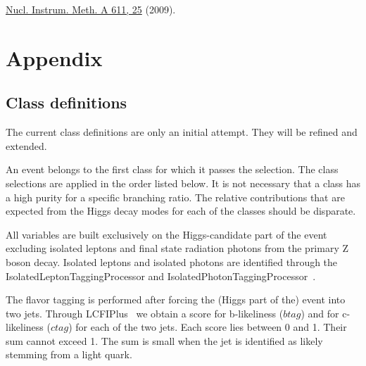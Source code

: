 \documentclass[11pt, hidelinks, a4paper]{scrartcl}
\begin{document}
\begin{thebibliography}{10}
{    \href{https://arxiv.org/abs/0907.3577}{Nucl. Instrum. Meth. A 611, 25} (2009).
  }
  \end{thebibliography}\endgroup %

  \newpage
  \appendix
  \section*{Appendix}
  \subsection*{Class definitions}
  The current class definitions are only an initial attempt.
  They will be refined and extended.

  An event belongs to the first class for which it passes the selection.
  The class selections are applied in the order listed below.
  It is not necessary that a class has a high purity for a specific branching ratio.
  The relative contributions that are expected from the Higgs decay modes
  for each of the classes
  should be disparate.

  All variables are built exclusively on the Higgs-candidate part of the event
  excluding isolated leptons and final state radiation photons from the primary Z boson decay.
  Isolated leptons and isolated photons are identified through the
  IsolatedLeptonTaggingProcessor
  and IsolatedPhotonTaggingProcessor~\cite{ILCSoft}.

  The flavor tagging is performed after forcing the (Higgs part of the)
  event into two jets.
  Through LCFIPlus~\cite{LCFIPlus} we obtain a score for b-likeliness ($btag$)
  and for c-likeliness ($ctag$) for each of the two jets.
  Each score lies between 0 and 1.
  Their sum cannot exceed 1.
  The sum is small when the jet is identified as likely stemming from a light quark.
\end{document}

